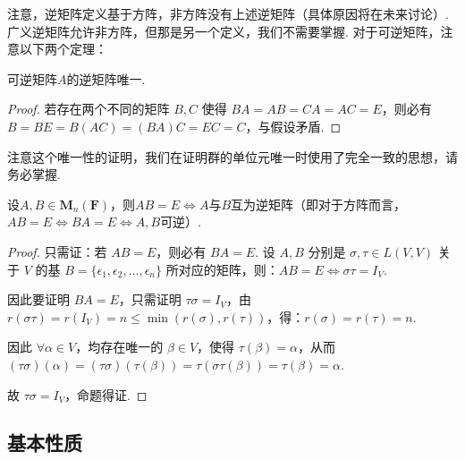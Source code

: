 注意，逆矩阵定义基于方阵，非方阵没有上述逆矩阵（具体原因将在未来讨论）. 广义逆矩阵允许非方阵，但那是另一个定义，我们不需要掌握. 对于可逆矩阵，注意以下两个定理：
\begin{theorem}{}{}
    可逆矩阵$A$的逆矩阵唯一.
\end{theorem}

\begin{proof}
    若存在两个不同的矩阵 $B,C$ 使得 $BA=AB=CA=AC=E$，则必有 $B=BE=B(AC)=(BA)C=EC=C$，与假设矛盾.
\end{proof}
注意这个唯一性的证明，我们在证明群的单位元唯一时使用了完全一致的思想，请务必掌握.

\begin{theorem}{}{}
    设$A,B\in \mathbf{M}_n(\mathbf{F})$，则$AB=E \iff A$与$B$互为逆矩阵（即对于方阵而言，$AB=E\iff BA=E\iff A,B$可逆）.
\end{theorem}

\begin{proof}
    只需证：若 $AB=E$，则必有 $BA=E$.
    设 $A,B$ 分别是 $\sigma, \tau \in L(V,V)$ 关于 $V$ 的基 $B=\{\epsilon_1,\epsilon_2,\ldots,\epsilon_n\}$ 所对应的矩阵，则：$AB=E \iff \sigma\tau = I_V$.

    因此要证明 $BA=E$，只需证明 $\tau\sigma=I_V$，由 $r(\sigma\tau)=r(I_V)=n \leq \min(r(\sigma),r(\tau))$，得：$r(\sigma)=r(\tau)=n$.

    因此 $\forall \alpha \in V$，均存在唯一的 $\beta \in V$，使得 $\tau(\beta)=\alpha$，从而 $(\tau\sigma)(\alpha)=(\tau\sigma)(\tau(\beta))=\tau(\sigma\tau(\beta))=\tau(\beta)=\alpha$.

    故 $\tau\sigma=I_V$，命题得证.
\end{proof}

\subsection{基本性质}

